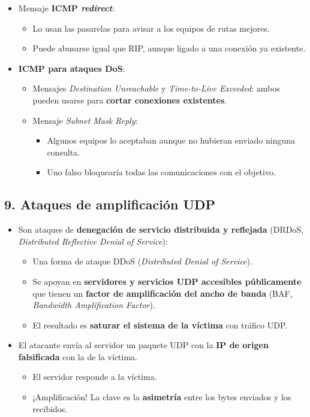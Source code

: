 \documentclass[11pt,a4paper]{report}
\begin{document}
\begin{itemize}
  \item Mensaje \textbf{ICMP \emph{redirect}}:
    \begin{itemize}
      \item Lo usan las pasarelas para avisar a los equipos de rutas mejores.
      \item Puede abusarse igual que RIP, aunque ligado a una conexión ya existente.
    \end{itemize}
  \item \textbf{ICMP para ataques DoS}:
    \begin{itemize}
      \item Mensajes \emph{Destination Unreachable} y \emph{Time-to-Live Exceeded}: ambos pueden usarse para \textbf{cortar conexiones existentes}.
      \item Mensaje \emph{Subnet Mask Reply}:
        \begin{itemize}
          \item Algunos equipos lo aceptaban aunque no hubieran enviado ninguna consulta.
          \item Uno falso bloquearía todas las comunicaciones con el objetivo.
        \end{itemize}
    \end{itemize}
\end{itemize}
 
\subsection{9. Ataques de amplificación UDP}
 
\begin{itemize}
  \item Son ataques de \textbf{denegación de servicio distribuida y reflejada} (DRDoS, \emph{Distributed Reflective Denial of Service}):
    \begin{itemize}
      \item Una forma de ataque DDoS (\emph{Distributed Denial of Service}).
      \item Se apoyan en \textbf{servidores y servicios UDP accesibles públicamente} que tienen un \textbf{factor de amplificación del ancho de banda} (BAF, \emph{Bandwidth Amplification Factor}).
      \item El resultado es \textbf{saturar el sistema de la víctima} con tráfico UDP.
    \end{itemize}
  \item El atacante envía al servidor un paquete UDP con la \textbf{IP de origen falsificada} con la de la víctima.
    \begin{itemize}
      \item El servidor responde a la víctima.
      \item ¡Amplificación! La clave es la \textbf{asimetría} entre los bytes enviados y los recibidos.
    \end{itemize}
\end{itemize}
 
\end{document}
